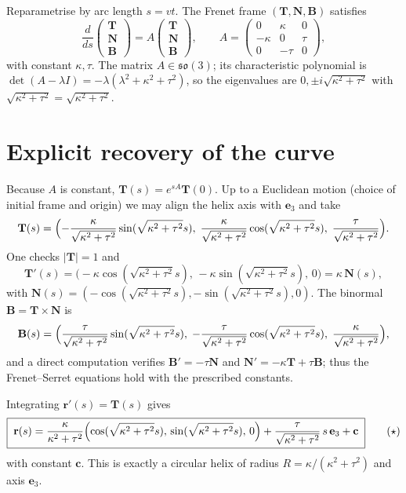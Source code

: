 \documentclass[11pt]{article}
\newcommand{\Om}{\sqrt{\kappa^{2}+\tau^{2}}}
\begin{document}
Reparametrise by arc length $s=vt$. The Frenet frame
$(\mathbf T,\mathbf N,\mathbf B)$ satisfies
\[
\frac{d}{ds}
\begin{pmatrix}\mathbf T\\ \mathbf N\\ \mathbf B\end{pmatrix}
=
A
\begin{pmatrix}\mathbf T\\ \mathbf N\\ \mathbf B\end{pmatrix},
\qquad
A=
\begin{pmatrix}
0 & \kappa & 0\\
-\kappa & 0 & \tau\\
0 & -\tau & 0
\end{pmatrix},
\]
with constant $\kappa,\tau$. The matrix $A\in\mathfrak{so}(3)$; its
characteristic polynomial is
$\det(A-\lambda I)=-\lambda(\lambda^{2}+\kappa^{2}+\tau^{2})$, so the
eigenvalues are $0,\pm i\Om$ with $\Om=\sqrt{\kappa^{2}+\tau^{2}}$.

\section{Explicit recovery of the curve}
\label{sec:rec}

Because $A$ is constant, $\mathbf T(s)=e^{sA}\mathbf T(0)$. Up to a Euclidean
motion (choice of initial frame and origin) we may align the helix axis with
$\mathbf e_{3}$ and take
\[
\mathbf T(s)=\Bigl(-\frac{\kappa}{\Om}\sin(\Om s),\;
\frac{\kappa}{\Om}\cos(\Om s),\;
\frac{\tau}{\Om}\Bigr).
\]
One checks $|\mathbf T|=1$ and
\[
\mathbf T'(s)=\bigl(-\kappa\cos(\Om s),\,-\kappa\sin(\Om s),\,0\bigr)
=\kappa\,\mathbf N(s),
\]
with $\mathbf N(s)=(-\cos(\Om s),-\sin(\Om s),0)$. The binormal
$\mathbf B=\mathbf T\times\mathbf N$ is
\[
\mathbf B(s)=\Bigl(\frac{\tau}{\Om}\sin(\Om s),\;
-\frac{\tau}{\Om}\cos(\Om s),\;
\frac{\kappa}{\Om}\Bigr),
\]
and a direct computation verifies $\mathbf B'=-\tau\mathbf N$ and
$\mathbf N'=-\kappa\mathbf T+\tau\mathbf B$; thus the Frenet--Serret
equations hold with the prescribed constants.

Integrating $\mathbf r'(s)=\mathbf T(s)$ gives
\[
\boxed{\;
\mathbf r(s)=\frac{\kappa}{\kappa^{2}+\tau^{2}}
\Bigl(\cos(\Om s),\,\sin(\Om s),\,0\Bigr)
+\frac{\tau}{\Om}\,s\,\mathbf e_{3}+\mathbf c\;}
\tag{$\star$}
\]
with constant $\mathbf c$. This is exactly a circular helix of radius
$R=\kappa/(\kappa^{2}+\tau^{2})$ and axis $\mathbf e_{3}$.
\end{document}

